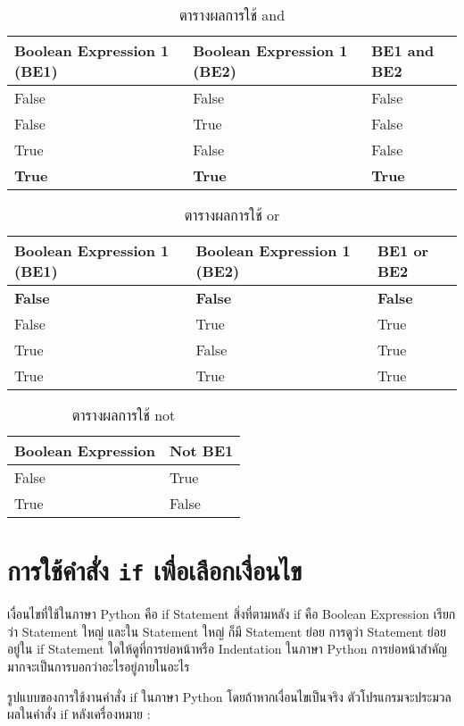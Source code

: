 \begin{table}
\caption{ตารางผลการใช้ and}
\centering
\begin{tabu}{l l l}
 \hline
Boolean Expression 1 (BE1) & Boolean Expression 1 (BE2) & BE1 and BE2  \\ [0.5ex] 
 \hline
False & False & False \\
False & True & False  \\
True & False & False \\
\textbf{True} & \textbf{True} & \textbf{True} \\
\end{tabu}
\end{table}

\begin{table}
\caption{ตารางผลการใช้ or}
\centering
\begin{tabu}{l l l}
 \hline
Boolean Expression 1 (BE1) & Boolean Expression 1 (BE2) & BE1 or BE2  \\ [0.5ex] 
 \hline
\textbf{False} & \textbf{False} & \textbf{False} \\
False & True & True  \\
True & False & True \\
True & True & True \\
\end{tabu}
\end{table}

\begin{table}
\caption{ตารางผลการใช้ not}
\centering
\begin{tabu}{l l}
 \hline
 Boolean Expression & Not BE1  \\ [0.5ex] 
 \hline
False	& True \\
True	& False \\
\end{tabu}
\end{table}

\section{การใช้คำสั่ง \texttt{if} เพื่อเลือกเงื่อนไข}

เงื่อนไขที่ใช้ในภาษา Python คือ if Statement สิ่งที่ตามหลัง if คือ Boolean Expression เรียกว่า Statement ใหญ่ และใน Statement ใหญ่ ก็มี Statement ย่อย การดูว่า Statement ย่อยอยู่ใน if Statement ใดให้ดูที่การย่อหน้าหรือ Indentation ในภาษา Python การย่อหน้าสำคัญมากจะเป็นการบอกว่าอะไรอยู่ภายในอะไร 

รูปแบบของการใช้งานคำสั่ง if ในภาษา Python โดยถ้าหากเงื่อนไขเป็นจริง ตัวโปรแกรมจะประมวลผลในคำสั่ง if หลังเครื่องหมาย : 

